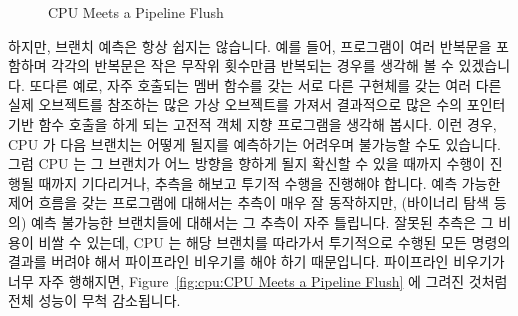 \begin{figure}[tb]
\centering
{}
\caption{CPU Meets a Pipeline Flush}
\end{figure}

하지만, 브랜치 예측은 항상 쉽지는 않습니다.
예를 들어, 프로그램이 여러 반복문을 포함하며 각각의 반복문은 작은 무작위
횟수만큼 반복되는 경우를 생각해 볼 수 있겠습니다.
또다른 예로, 자주 호출되는 멤버 함수를 갖는 서로 다른 구현체를 갖는 여러 다른
실제 오브젝트를 참조하는 많은 가상 오브젝트를 가져서 결과적으로 많은 수의
포인터 기반 함수 호출을 하게 되는 고전적 객체 지향 프로그램을 생각해 봅시다.
이런 경우, CPU 가 다음 브랜치는 어떻게 될지를 예측하기는 어려우며 불가능할 수도
있습니다.
그럼 CPU 는 그 브랜치가 어느 방향을 향하게 될지 확신할 수 있을 때까지 수행이
진행될 때까지 기다리거나, 추측을 해보고 투기적 수행을 진행해야 합니다.
예측 가능한 제어 흐름을 갖는 프로그램에 대해서는 추측이 매우 잘 동작하지만,
(바이너리 탐색 등의) 예측 불가능한 브랜치들에 대해서는 그 추측이 자주 틀립니다.
잘못된 추측은 그 비용이 비쌀 수 있는데, CPU 는 해당 브랜치를 따라가서
투기적으로 수행된 모든 명령의 결과를 버려야 해서 파이프라인 비우기를 해야 하기
때문입니다.
파이프라인 비우기가 너무 자주 행해지면,
Figure~\ref{fig:cpu:CPU Meets a Pipeline Flush} 에 그려진 것처럼 전체 성능이
무척 감소됩니다.

\iffalse

